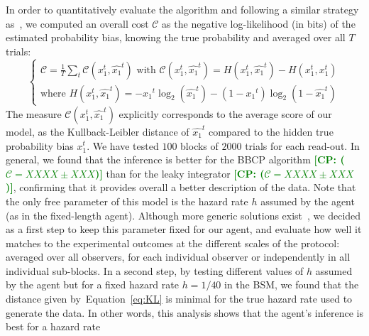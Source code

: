 \documentclass[12pt,english]{article}%
\newcommand{\choice}[1]{ %
	\left\{ %
		\begin{array}{l} #1 \end{array} %
	\right. }
\newcommand{\eql}[1]{\begin{equation}#1\end{equation}}
\newcommand{\Cc}{\mathcal{C}}
\newcommand{\citep}[1]{\parencite{#1}}
\newcommand{\citet}[1]{\textcite{#1}}
\newcommand{\seeEq}[1]{Equation~\ref{eq:#1}}
\newcommand{\CP}[1]{\textbf{\textcolor{green}{[CP: #1]}}}
\begin{document}
In order to quantitatively evaluate the algorithm and following a similar strategy as~\citet{Norton18},
we computed an overall cost $\Cc$ as the negative log-likelihood (in bits) of the estimated probability bias, knowing the true probability
and averaged over all $T$ trials:
\eql{
\choice{
 \Cc = \frac 1 T  \sum_t \Cc(x_1^t, \hat{x_1}^t)
 \text{ with } 
 \Cc(x_1^t, \hat{x_1}^t) = H(x_1^t, \hat{x_1}^t ) - H(x_1^t, x_1^t ) \\
 \text{where } H(x_1^t, \hat{x_1}^t ) = - {x_1}^t \log_2( \hat{x_1}^t ) - (1-{x_1}^t) \log_2( 1- \hat{x_1}^t) 
}
\label{eq:KL}
}
The measure $\Cc(x_1^t, \hat{x_1}^t)$ explicitly corresponds to the average score of our model,
as the Kullback-Leibler distance of $\hat{x_1}^t$ %
compared to the hidden true probability bias $x_1^t$.
We have tested $100$ blocks of $2000$ trials for each read-out.
In general, we found that the inference is better for the BBCP algorithm \CP{($\Cc = XXXX \pm XXX$)}
than for the leaky integrator \CP{($\Cc = XXXX \pm XXX$)}, confirming that it provides overall a better description of the data.
Note that the only free parameter of this model is the hazard rate $h$
assumed by the agent (as in the fixed-length agent).
Although more generic solutions exist~\citep{Wilson13,Wilson18},
we decided as a first step to keep this parameter fixed for our agent, 
and  evaluate how well it matches to the experimental outcomes at the different scales of the protocol:
averaged over all observers, for each individual observer or independently in all individual sub-blocks.
In a second step, by testing different values of $h$ assumed by the agent
but for a fixed hazard rate $h=1/40$ in the BSM,
we found that the distance given by~\seeEq{KL} is minimal 
for the true hazard rate used to generate the data.
In other words, this analysis shows that the agent's inference is best for a hazard rate
\end{document}
